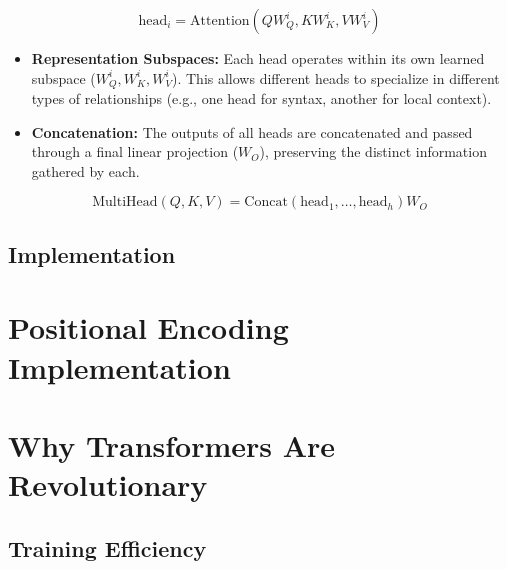 \documentclass{article}
\begin{document}
\begin{equation}
\text{head}_i = \text{Attention}(QW_Q^i, KW_K^i, VW_V^i)
\end{equation}

\begin{itemize}
   \item \textbf{Representation Subspaces:} Each head operates within its own learned subspace ($W_Q^i, W_K^i, W_V^i$). This allows different heads to specialize in different types of relationships (e.g., one head for syntax, another for local context).
   \item \textbf{Concatenation:} The outputs of all heads are concatenated and passed through a final linear projection ($W_O$), preserving the distinct information gathered by each.
\end{itemize}

\begin{equation}
\text{MultiHead}(Q, K, V) = \text{Concat}(\text{head}_1, \ldots, \text{head}_h)W_O
\end{equation}

\subsection{Implementation}

\section{Positional Encoding Implementation}


\section{Why Transformers Are Revolutionary}

\subsection{Training Efficiency}
\end{document}
